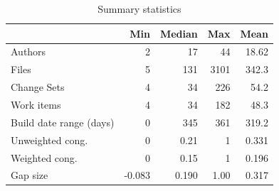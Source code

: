 

\begin{table}[t]
\centering
\begin{tabular}{l|rrrr}


 & Min & Median & Max & Mean\\\hline
Authors & 2 & 17 & 44 & 18.62\\
Files & 5 & 131 & 3101 & 342.3 \\
Change Sets & 4  & 34  & 226 & 54.2\\
Work items & 4 & 34  & 182 & 48.3 \\
Build date range (days) & 0  & 345  & 361 & 319.2 \\
Unweighted cong. & 0  & 0.21  & 1 & 0.331 \\
Weighted cong. & 0 & 0.15  & 1 & 0.196\\
Gap size & -0.083 & 0.190 & 1.00 & 0.317 \\
\hline
\end{tabular}
\caption{Summary statistics}
\label{tab:summary}
\end{table}

